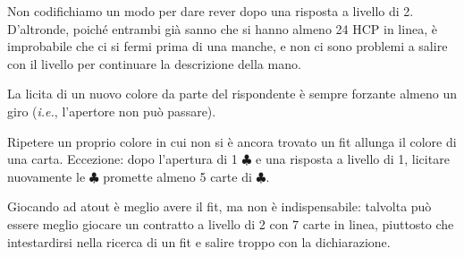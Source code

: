\documentclass[a4paper,10pt]{article}
\renewcommand{\c}{$\clubsuit$\xspace}
\newcommand{\smallspace}{\vskip0.3cm}
\begin{document}
\smallspace

Non codifichiamo un modo per dare rever dopo una risposta a livello di 2. D'altronde, poiché entrambi già sanno che si hanno almeno 24 HCP in linea, è improbabile che ci si fermi prima di una manche, e non ci sono problemi a salire con il livello per continuare la descrizione della mano.

\smallspace

La licita di un nuovo colore da parte del rispondente è sempre forzante almeno un giro (\emph{i.e.}, l'apertore non può passare).

\smallspace

Ripetere un proprio colore in cui non si è ancora trovato un fit allunga il colore di una carta. Eccezione: dopo l'apertura di 1 \c e una risposta a livello di 1, licitare nuovamente le \c promette almeno 5 carte di \c.

\smallspace

Giocando ad atout è meglio avere il fit, ma non è indispensabile: talvolta può essere meglio giocare un contratto a livello di 2 con 7 carte in linea, piuttosto che intestardirsi nella ricerca di un fit e salire troppo con la dichiarazione.
\end{document}
